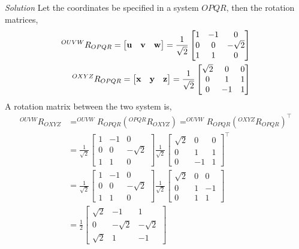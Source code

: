 \documentclass{article}
\numberwithin{prob}{section}
\newenvironment{solution}{\emph{Solution}}{}
\begin{document}
\begin{solution}
Let the coordinates be specified in a system $OPQR$, then the rotation matrices, 
\begin{align}
  ^{OUVW}R_{OPQR} = \begin{bmatrix}
    \mathbf{u} & \mathbf{v} & \mathbf{w} 
  \end{bmatrix} 
  = \frac{1}{\sqrt2}\begin{bmatrix} 
    1 & -1 & 0 \\
    0 & 0 & -\sqrt{2} \\
    1 & 1 & 0
  \end{bmatrix}\\
  ^{OXYZ}R_{OPQR} = \begin{bmatrix}
    \mathbf{x} & \mathbf{y} & \mathbf{z} 
  \end{bmatrix} 
  = \frac{1}{\sqrt2}\begin{bmatrix} 
    \sqrt2 & 0 & 0 \\
    0 & 1 & 1\\
    0 & -1 & 1
  \end{bmatrix}
\end{align}
A rotation matrix between the two system is,
\begin{align}
  ^{OUVW}R_{OXYZ} &= ^{OUVW}R_{OPQR} (^{OPQR}R_{OXYZ}) = ^{OUVW}R_{OPQR} (^{OXYZ}R_{OPQR})^\top\\
                  &= \frac{1}{\sqrt2}\begin{bmatrix} 
    1 & -1 & 0 \\
    0 & 0 & -\sqrt{2} \\
    1 & 1 & 0
  \end{bmatrix}
  \frac{1}{\sqrt2}\begin{bmatrix} 
    \sqrt2 & 0 & 0 \\
    0 & 1 & 1\\
    0 & -1 & 1
  \end{bmatrix}^\top\\
                  &= \frac{1}{\sqrt2}\begin{bmatrix} 
    1 & -1 & 0 \\
    0 & 0 & -\sqrt{2} \\
    1 & 1 & 0
  \end{bmatrix}
  \frac{1}{\sqrt2}\begin{bmatrix} 
    \sqrt2 & 0 & 0 \\
    0 & 1 & -1\\
    0 & 1 & 1
  \end{bmatrix}\\
                  &= \frac{1}{2}\begin{bmatrix}
                    \sqrt{2} & -1 & 1 \\
                    0 & -\sqrt2 & -\sqrt2\\
                    \sqrt2 & 1 & -1
                  \end{bmatrix}
\end{align}
\end{solution}
\end{document}
